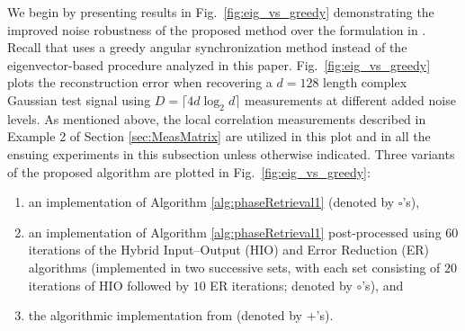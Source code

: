 We begin by presenting results in Fig.~\ref{fig:eig_vs_greedy} demonstrating the improved noise robustness of the proposed method over the formulation in \cite{IVW2015_FastPhase}. Recall that \cite{IVW2015_FastPhase} uses a greedy angular synchronization method instead of the eigenvector-based procedure analyzed in this paper. Fig.~\ref{fig:eig_vs_greedy} plots the reconstruction error when recovering a $d=128$ length complex Gaussian test signal using $D=\lceil 4d\log_2 d\rceil$ measurements at different added noise levels. As mentioned above, the local correlation measurements described in Example 2 of Section \ref{sec:MeasMatrix} are utilized in this plot and in all the ensuing experiments in this subsection unless otherwise indicated. Three variants of the proposed algorithm are plotted in Fig.~\ref{fig:eig_vs_greedy}: \begin{enumerate} \item an implementation of Algorithm \ref{alg:phaseRetrieval1} (denoted by $\square$'s),
    \item an implementation of Algorithm \ref{alg:phaseRetrieval1} post-processed using $60$ iterations of the Hybrid Input--Output (HIO) and Error Reduction (ER) algorithms (implemented in two successive sets, with each set consisting of $20$ iterations of HIO followed by $10$ ER iterations; denoted by $\circ$'s), and 
    \item the algorithmic implementation from \cite{IVW2015_FastPhase} (denoted by $+$'s). 
\end{enumerate}
%
